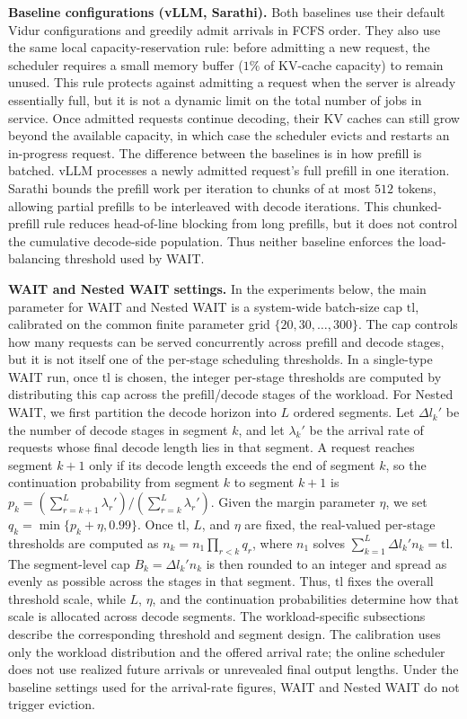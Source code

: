 \textbf{Baseline configurations (vLLM, Sarathi).} Both baselines use their default Vidur configurations and greedily admit arrivals in FCFS order. They also use the same local capacity-reservation rule: before admitting a new request, the scheduler requires a small memory buffer ($1\%$ of KV-cache capacity) to remain unused. This rule protects against admitting a request when the server is already essentially full, but it is not a dynamic limit on the total number of jobs in service. Once admitted requests continue decoding, their KV caches can still grow beyond the available capacity, in which case the scheduler evicts and restarts an in-progress request. The difference between the baselines is in how prefill is batched. vLLM processes a newly admitted request's full prefill in one iteration. Sarathi bounds the prefill work per iteration to chunks of at most $512$ tokens, allowing partial prefills to be interleaved with decode iterations. This chunked-prefill rule reduces head-of-line blocking from long prefills, but it does not control the cumulative decode-side population. Thus neither baseline enforces the load-balancing threshold used by WAIT.

\textbf{WAIT and Nested WAIT settings.} In the experiments below, the main parameter for WAIT and Nested WAIT is a system-wide batch-size cap $\mathrm{tl}$, calibrated on the common finite parameter grid \(\{20,30,\ldots,300\}\). The cap controls how many requests can be served concurrently across prefill and decode stages, but it is not itself one of the per-stage scheduling thresholds. In a single-type WAIT run, once $\mathrm{tl}$ is chosen, the integer per-stage thresholds are computed by distributing this cap across the prefill/decode stages of the workload. For Nested WAIT, we first partition the decode horizon into \(L\) ordered segments. Let \(\Delta l_k'\) be the number of decode stages in segment \(k\), and let \(\lambda_k'\) be the arrival rate of requests whose final decode length lies in that segment. A request reaches segment \(k{+}1\) only if its decode length exceeds the end of segment \(k\), so the continuation probability from segment \(k\) to segment \(k{+}1\) is \(p_k=(\sum_{r=k+1}^L\lambda_r')/(\sum_{r=k}^L\lambda_r')\). Given the margin parameter \(\eta\), we set \(q_k=\min\{p_k+\eta,0.99\}\). Once \(\mathrm{tl}\), \(L\), and \(\eta\) are fixed, the real-valued per-stage thresholds are computed as \(n_k=n_1\prod_{r<k}q_r\), where \(n_1\) solves \(\sum_{k=1}^L \Delta l_k' n_k=\mathrm{tl}\). The segment-level cap \(B_k=\Delta l_k'n_k\) is then rounded to an integer and spread as evenly as possible across the stages in that segment. Thus, \(\mathrm{tl}\) fixes the overall threshold scale, while \(L\), \(\eta\), and the continuation probabilities determine how that scale is allocated across decode segments. The workload-specific subsections describe the corresponding threshold and segment design. The calibration uses only the workload distribution and the offered arrival rate; the online scheduler does not use realized future arrivals or unrevealed final output lengths. Under the baseline settings used for the arrival-rate figures, WAIT and Nested WAIT do not trigger eviction.


